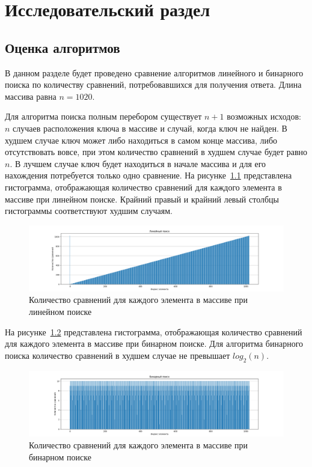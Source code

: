 \chapter{Исследовательский раздел}

\section{Оценка алгоритмов}

В данном разделе будет проведено сравнение алгоритмов линейного и бинарного поиска по количеству сравнений, потребовавшихся для получения ответа. Длина массива равна $n = 1020$. 

Для алгоритма поиска полным перебором существует $n + 1$ возможных исходов: $n$ случаев расположения ключа в массиве и случай, когда ключ не найден. В худшем случае ключ может либо находиться в самом конце массива, либо отсутствовать вовсе, при этом количество сравнений в худшем случае будет равно $n$. В лучшем случае ключ будет находиться в начале массива и для его нахождения потребуется только одно сравнение. На рисунке~\ref{fig:linear_hist} представлена гистограмма, отображающая количество сравнений для каждого элемента в массиве при линейном поиске. Крайний правый и крайний левый столбцы гистограммы соответствуют худшим случаям.

\begin{figure}[H]
\centering
\includegraphics[width=\textwidth]{inc/img/linear_search_hist.png}
\caption{Количество сравнений для каждого элемента в массиве при линейном поиске}
\label{fig:linear_hist}
\end{figure}

На рисунке~\ref{fig:binary_hist} представлена гистограмма, отображающая количество сравнений для каждого элемента в массиве при бинарном поиске. Для алгоритма бинарного поиска количество сравнений в худшем случае не превышает $log_2(n)$.

\begin{figure}[H]
\centering
\includegraphics[width=\textwidth]{inc/img/binary_search_hist.png}
\caption{Количество сравнений для каждого элемента в массиве при бинарном поиске}
\label{fig:binary_hist}
\end{figure}

